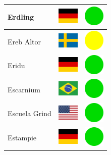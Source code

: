 \documentclass[12pt, a4paper, twoside]{report}
\begin{document}
\begin{center}
\begin{longtable}{|p{5cm}|p{2cm}|p{2cm}|}
 Erdling                                                    & \includegraphics[width=1cm]{../img/flags/de} &   \includegraphics[width=1cm]{../likes/y} \\ \hline
 Ereb Altor                                                 & \includegraphics[width=1cm]{../img/flags/se} &   \includegraphics[width=1cm]{../likes/m} \\ \hline
 Eridu                                                      & \includegraphics[width=1cm]{../img/flags/de} &   \includegraphics[width=1cm]{../likes/y} \\ \hline
 Escarnium                                                  & \includegraphics[width=1cm]{../img/flags/br} &   \includegraphics[width=1cm]{../likes/y} \\ \hline
 Escuela Grind                                              & \includegraphics[width=1cm]{../img/flags/us} &   \includegraphics[width=1cm]{../likes/y} \\ \hline
 Estampie                                                   & \includegraphics[width=1cm]{../img/flags/de} &   \includegraphics[width=1cm]{../likes/y} \\ \hline

\end{longtable}
\end{center}
\end{document}
